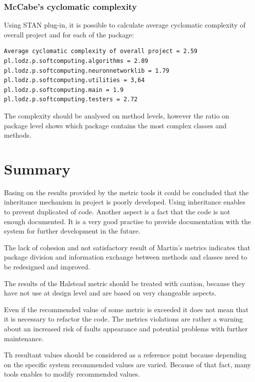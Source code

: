\subsubsection*{McCabe's cyclomatic complexity}

Using STAN plug-in, it is possible to calculate average cyclomatic complexity of overall project and for each of the package:
\begin{verbatim}
Average cyclomatic complexity of overall project = 2.59
pl.lodz.p.softcomputing.algorithms = 2.89
pl.lodz.p.softcomputing.neuronnetworklib = 1.79 
pl.lodz.p.softcomputing.utilities = 3,64
pl.lodz.p.softcomputing.main = 1.9
pl.lodz.p.softcomputing.testers = 2.72
\end{verbatim}

The complexity should be analysed on method levels, however the ratio on package level shows which package contains the most complex classes and methods.

\section{Summary}
Basing on the results provided by the metric tools it could be concluded that the inheritance mechanism in project is poorly developed. Using inheritance enables to prevent duplicated of code. Another aspect is a fact that the code is not enough documented. It is a very good practise to provide documentation with the system for further development in the future. 

The lack of cohesion and not satisfactory result of Martin's metrics indicates that package division and information exchange between methods and classes need to be redesigned and improved. 

The results of the Halstead metric should be treated with caution, because they have not use at design level and are based on very changeable aspects.

Even if the recommended value of some metric is exceeded it does not mean that it is necessary to refactor the code. The metrics violations are rather a warning about an increased risk of faults appearance and potential problems with further maintenance. 

Th resultant values should be considered as a reference point because depending on the specific system recommended values are varied. Because of that fact, many tools enables to modify  recommended values. 
